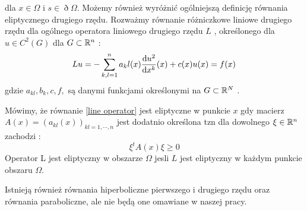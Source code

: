 \documentclass[12pt,a4paper]{report}
\begin{document}
dla $x \in \Omega$ i $s \in \eth \Omega$. 
Możemy również wyróżnić ogólniejszą definicję równania eliptycznego drugiego rzędu. Rozważmy równanie różniczkowe liniowe drugiego rzędu dla ogólnego operatora liniowego drugiego rzędu $L$ \label{line operator}, określonego dla $ u \in C^2(G)$ dla $G \subset \mathbb{R}^{n}$ : %
$$
Lu = -\sum_{k,l =1}^{n} a_kl(x) \ddx[u^2]{x^k} (x) + c(x)u(x) = f(x) 
$$
gdzie $ a_{kl}, b_{k}, c, f, $ są danymi funkcjami określonymi na $G \subset \mathbb{R}^N$ .
\begin{definition}
Mówimy, że równanie  \ref{line operator} jest eliptyczne w punkcie $x$ gdy macierz $A(x) = (a_{kl}(x))_{kl=1,\cdots,n}$ jest dodatnio określona tzn dla dowolnego $ \xi \in \mathbb{R}^{n}$ zachodzi :
$$
\xi^{t} A(x) \xi \geq 0
$$
Operator L jest eliptyczny w obszarze $\Omega$ jesli $L$ jest eliptyczny w każdym punkcie obszaru $\Omega$.
\end{definition}
Istnieją również równania hiperboliczne pierwszego i drugiego rzędu oraz równania paraboliczne, ale nie będą one omawiane w naszej pracy. 
\end{document}
